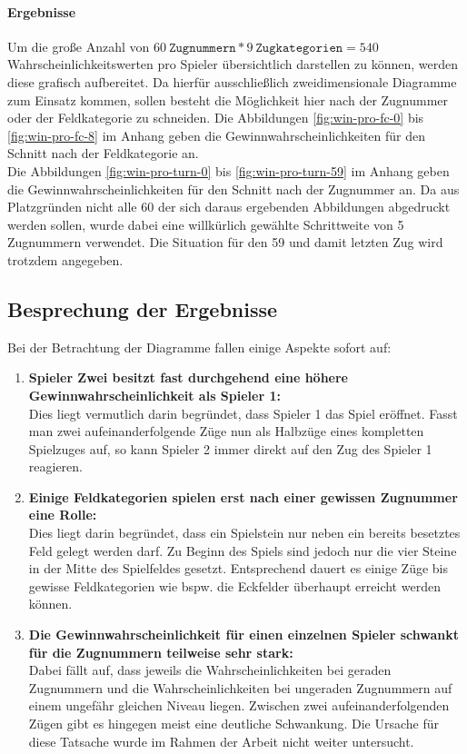 \paragraph{Ergebnisse}
Um die große Anzahl von $60\ \mathtt{Zugnummern} * 9\ \mathtt{Zugkategorien} = 540$ Wahrscheinlichkeitswerten pro Spieler übersichtlich darstellen zu können, werden diese grafisch aufbereitet. Da hierfür ausschließlich zweidimensionale Diagramme zum Einsatz kommen, sollen besteht die Möglichkeit hier nach der Zugnummer oder der Feldkategorie zu schneiden. Die Abbildungen \ref{fig:win-pro-fc-0} bis \ref{fig:win-pro-fc-8} im Anhang geben die Gewinnwahrscheinlichkeiten für den Schnitt nach der Feldkategorie an.
\\Die Abbildungen \ref{fig:win-pro-turn-0} bis \ref{fig:win-pro-turn-59} im Anhang geben die Gewinnwahrscheinlichkeiten für den Schnitt nach der Zugnummer an. Da aus Platzgründen nicht alle 60 der sich daraus ergebenden Abbildungen abgedruckt werden sollen, wurde dabei eine willkürlich gewählte Schrittweite von 5 Zugnummern verwendet. Die Situation für den 59 und damit letzten Zug wird trotzdem angegeben.

\subsection{Besprechung der Ergebnisse}
Bei der Betrachtung der Diagramme fallen einige Aspekte sofort auf:
\begin{enumerate}
\item \textbf{Spieler Zwei besitzt fast durchgehend eine höhere Gewinnwahrscheinlichkeit als Spieler 1:}
\\Dies liegt vermutlich darin begründet, dass Spieler 1 das Spiel eröffnet. Fasst man zwei aufeinanderfolgende Züge nun als Halbzüge eines kompletten Spielzuges auf, so kann Spieler 2 immer direkt auf den Zug des Spieler 1 reagieren.
\item \textbf{Einige Feldkategorien spielen erst nach einer gewissen Zugnummer eine Rolle:}
\\Dies liegt darin begründet, dass ein Spielstein nur neben ein bereits besetztes Feld gelegt werden darf. Zu Beginn des Spiels sind jedoch nur die vier Steine in der Mitte des Spielfeldes gesetzt. Entsprechend dauert es einige Züge bis gewisse Feldkategorien wie bspw. die Eckfelder überhaupt erreicht werden können.
\item \textbf{Die Gewinnwahrscheinlichkeit für einen einzelnen Spieler schwankt für die Zugnummern teilweise sehr stark:}
\\Dabei fällt auf, dass jeweils die Wahrscheinlichkeiten bei geraden Zugnummern und die Wahrscheinlichkeiten bei ungeraden Zugnummern auf einem ungefähr gleichen Niveau liegen. Zwischen zwei aufeinanderfolgenden Zügen gibt es hingegen meist eine deutliche Schwankung. Die Ursache für diese Tatsache wurde im Rahmen der Arbeit nicht weiter untersucht. 
\end{enumerate}